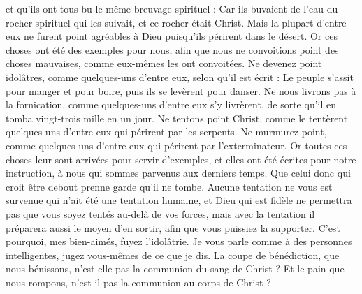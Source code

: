 \begin{multicols}{2}
et qu'ils ont tous bu le même breuvage spirituel : Car ils buvaient de l'eau du rocher spirituel qui les suivait, et ce rocher était Christ.
Mais la plupart d’entre eux ne furent point agréables à Dieu puisqu’ils périrent dans le désert.
Or ces choses ont été des exemples pour nous, afin que nous ne convoitions point des choses mauvaises, comme eux-mêmes les ont convoitées.
Ne devenez point idolâtres, comme quelques-uns d’entre eux, selon qu'il est écrit : Le peuple s’assit pour manger et pour boire, puis ils se levèrent pour danser.
Ne nous livrons pas à la fornication, comme quelques-uns d’entre eux s’y livrèrent, de sorte qu’il en tomba vingt-trois mille en un jour.
Ne tentons point Christ, comme le tentèrent quelques-uns d’entre eux qui périrent par les serpents.
Ne murmurez point, comme quelques-uns d’entre eux qui périrent par l’exterminateur.
Or toutes ces choses leur sont arrivées pour servir d’exemples, et elles ont été écrites pour notre instruction, à nous qui sommes parvenus aux derniers temps.
Que celui donc qui croit être debout prenne garde qu'il ne tombe.
Aucune tentation ne vous est survenue qui n’ait été une tentation humaine, et Dieu qui est fidèle ne permettra pas que vous soyez tentés au-delà de vos forces, mais avec la tentation il préparera aussi le moyen d’en sortir, afin que vous puissiez la supporter.
C'est pourquoi, mes bien-aimés, fuyez l'idolâtrie.
Je vous parle comme à des personnes intelligentes, jugez vous-mêmes de ce que je dis.
La coupe de bénédiction, que nous bénissons, n'est-elle pas la communion du sang de Christ ? Et le pain que nous rompons, n'est-il pas la communion au corps de Christ ?

\end{multicols}
